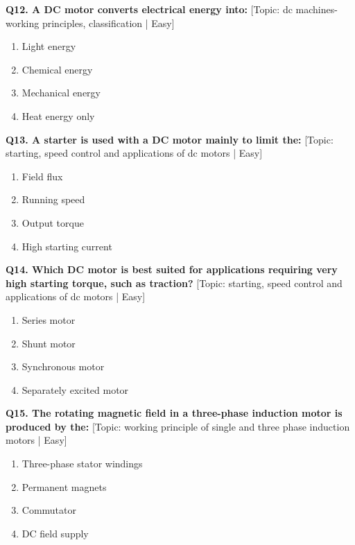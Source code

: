 \noindent\textbf{Q12. A DC motor converts electrical energy into:} \hfill [Topic: dc machines- working principles, classification | Easy]
\begin{enumerate}[label=(\alph*),topsep=2pt,itemsep=1pt,partopsep=0pt,parsep=0pt]
    \item {Light energy}
    \item {Chemical energy}
    \item {Mechanical energy}
    \item {Heat energy only}
\end{enumerate}
\vspace{2mm}

\noindent\textbf{Q13. A starter is used with a DC motor mainly to limit the:} \hfill [Topic: starting, speed control and applications of dc motors | Easy]
\begin{enumerate}[label=(\alph*),topsep=2pt,itemsep=1pt,partopsep=0pt,parsep=0pt]
    \item {Field flux}
    \item {Running speed}
    \item {Output torque}
    \item {High starting current}
\end{enumerate}
\vspace{2mm}

\noindent\textbf{Q14. Which DC motor is best suited for applications requiring very high starting torque, such as traction?} \hfill [Topic: starting, speed control and applications of dc motors | Easy]
\begin{enumerate}[label=(\alph*),topsep=2pt,itemsep=1pt,partopsep=0pt,parsep=0pt]
    \item {Series motor}
    \item {Shunt motor}
    \item {Synchronous motor}
    \item {Separately excited motor}
\end{enumerate}
\vspace{2mm}

\noindent\textbf{Q15. The rotating magnetic field in a three-phase induction motor is produced by the:} \hfill [Topic: working principle of single and three phase induction motors | Easy]
\begin{enumerate}[label=(\alph*),topsep=2pt,itemsep=1pt,partopsep=0pt,parsep=0pt]
    \item {Three-phase stator windings}
    \item {Permanent magnets}
    \item {Commutator}
    \item {DC field supply}
\end{enumerate}
\vspace{2mm}

